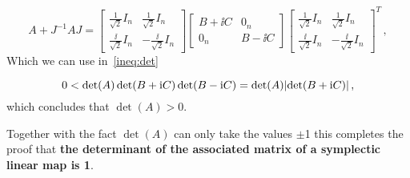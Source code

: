 \documentclass[12pt, class=report, crop=false]{standalone}
\begin{document}
\begin{equation*}
  A + J^{-1} A J =
  \begin{bmatrix}
    \frac{1}{\sqrt{2}} I_n & \frac{1}{\sqrt{2}} I_n\\
    \frac{\ii}{\sqrt{2}} I_n & -\frac{\ii}{\sqrt{2}} I_n
  \end{bmatrix}
  \begin{bmatrix}
    B+ \ii C & 0_n\\
    0_n & B-\ii C
  \end{bmatrix}
  \begin{bmatrix}
    \frac{1}{\sqrt{2}} I_n & \frac{1}{\sqrt{2}} I_n\\
    \frac{\ii}{\sqrt{2}} I_n & -\frac{\ii}{\sqrt{2}} I_n
  \end{bmatrix}^T\,,
\end{equation*}
Which we can use in~\cref{ineq:det}

\begin{equation*}
  0 < \det(A) \det(B+\mathrm{i} C) \det(B-\mathrm{i} C) = \det(A) \abs{\det(B+\mathrm{i} C)}\,,
\end{equation*}
which concludes that \(\det(A)>0\).

Together with the fact \(\det(A)\) can only take the values \(\pm\)1 this completes the proof that \textbf{the determinant of the associated matrix of a symplectic linear map is 1}.
\end{document}
